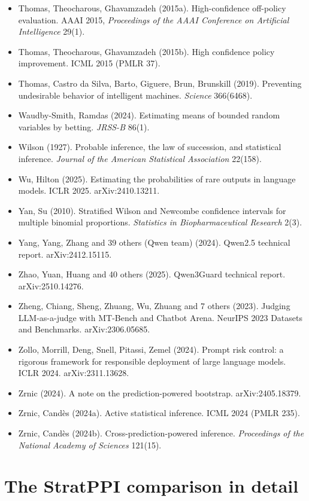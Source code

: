 \documentclass[11pt]{article}
\begin{document}
\begin{itemize}
\item Thomas, Theocharous, Ghavamzadeh (2015a). High-confidence off-policy evaluation. AAAI 2015, \emph{Proceedings of the AAAI Conference on Artificial Intelligence} 29(1).
\item Thomas, Theocharous, Ghavamzadeh (2015b). High confidence policy improvement. ICML 2015 (PMLR 37).
\item Thomas, Castro da Silva, Barto, Giguere, Brun, Brunskill (2019). Preventing undesirable behavior of intelligent machines. \emph{Science} 366(6468).
\item Waudby-Smith, Ramdas (2024). Estimating means of bounded random variables by betting. \emph{JRSS-B} 86(1).
\item Wilson (1927). Probable inference, the law of succession, and statistical inference. \emph{Journal of the American Statistical Association} 22(158).
\item Wu, Hilton (2025). Estimating the probabilities of rare outputs in language models. ICLR 2025. arXiv:2410.13211.
\item Yan, Su (2010). Stratified Wilson and Newcombe confidence intervals for multiple binomial proportions. \emph{Statistics in Biopharmaceutical Research} 2(3).
\item Yang, Yang, Zhang and 39 others (Qwen team) (2024). Qwen2.5 technical report. arXiv:2412.15115.
\item Zhao, Yuan, Huang and 40 others (2025). Qwen3Guard technical report. arXiv:2510.14276.
\item Zheng, Chiang, Sheng, Zhuang, Wu, Zhuang and 7 others (2023). Judging LLM-as-a-judge with MT-Bench and Chatbot Arena. NeurIPS 2023 Datasets and Benchmarks. arXiv:2306.05685.
\item Zollo, Morrill, Deng, Snell, Pitassi, Zemel (2024). Prompt risk control: a rigorous framework for responsible deployment of large language models. ICLR 2024. arXiv:2311.13628.
\item Zrnic (2024). A note on the prediction-powered bootstrap. arXiv:2405.18379.
\item Zrnic, Candès (2024a). Active statistical inference. ICML 2024 (PMLR 235).
\item Zrnic, Candès (2024b). Cross-prediction-powered inference. \emph{Proceedings of the National Academy of Sciences} 121(15).
\end{itemize}

\endgroup
\appendix

\section{The StratPPI comparison in detail}
\end{document}
